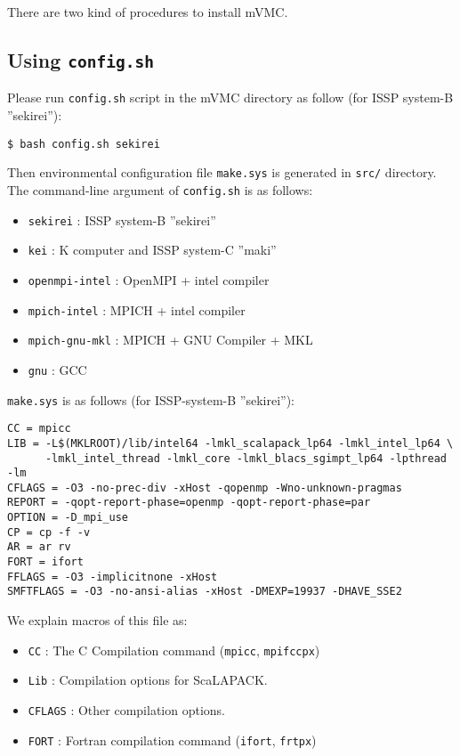 There are two kind of procedures to install mVMC.

\subsection{Using \texttt{config.sh}}

Please run \verb|config.sh| script in the mVMC directory as follow
(for ISSP system-B ''sekirei''):
\begin{verbatim}
$ bash config.sh sekirei
\end{verbatim}
Then environmental configuration file \verb|make.sys| is generated in 
\verb|src/| directory.
The command-line argument of \verb|config.sh| is as follows:
\begin{itemize}
\item \verb|sekirei| : ISSP system-B ''sekirei''
\item \verb|kei| : K computer and ISSP system-C ''maki''
\item \verb|openmpi-intel| : OpenMPI + intel compiler
\item \verb|mpich-intel| : MPICH + intel compiler
\item \verb|mpich-gnu-mkl| : MPICH + GNU Compiler + MKL
\item \verb|gnu| : GCC
\end{itemize}

\verb|make.sys| is as follows (for ISSP-system-B ''sekirei''):
\begin{verbatim}
CC = mpicc
LIB = -L$(MKLROOT)/lib/intel64 -lmkl_scalapack_lp64 -lmkl_intel_lp64 \
      -lmkl_intel_thread -lmkl_core -lmkl_blacs_sgimpt_lp64 -lpthread -lm
CFLAGS = -O3 -no-prec-div -xHost -qopenmp -Wno-unknown-pragmas
REPORT = -qopt-report-phase=openmp -qopt-report-phase=par
OPTION = -D_mpi_use
CP = cp -f -v
AR = ar rv
FORT = ifort
FFLAGS = -O3 -implicitnone -xHost
SMFTFLAGS = -O3 -no-ansi-alias -xHost -DMEXP=19937 -DHAVE_SSE2
\end{verbatim}
We explain macros of this file as: 
\begin{itemize}
\item \verb|CC| : The C Compilation command (\verb|mpicc|, \verb|mpifccpx|)
\item \verb|Lib| : Compilation options for ScaLAPACK.
\item \verb|CFLAGS| : Other compilation options.
\item \verb|FORT| : Fortran compilation command (\verb|ifort|, \verb|frtpx|)
\end{itemize}


